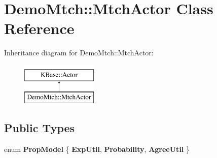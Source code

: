 \hypertarget{class_demo_mtch_1_1_mtch_actor}{\section{Demo\-Mtch\-:\-:Mtch\-Actor Class Reference}
\label{class_demo_mtch_1_1_mtch_actor}
}
Inheritance diagram for Demo\-Mtch\-:\-:Mtch\-Actor\-:\begin{figure}[H]
\begin{center}
\leavevmode
\includegraphics[height=2.000000cm]{class_demo_mtch_1_1_mtch_actor}
\end{center}
\end{figure}
\subsection*{Public Types}
\begin{DoxyCompactItemize}
\item 
enum {\bfseries Prop\-Model} \{ {\bfseries Exp\-Util}, 
{\bfseries Probability}, 
{\bfseries Agree\-Util}
 \}
\end{DoxyCompactItemize}
